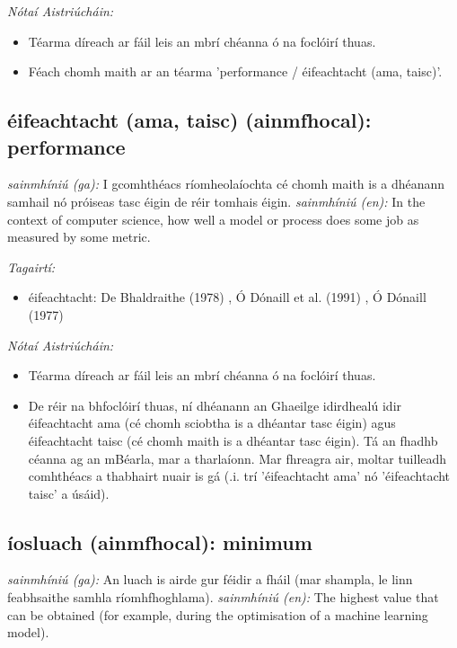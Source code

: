 \documentclass{article}
\begin{document}
 \noindent \textit{Nótaí Aistriúcháin:}
\begin{itemize}
	\item Téarma díreach ar fáil leis an mbrí chéanna ó na foclóirí thuas.
	\item Féach chomh maith ar an téarma 'performance / éifeachtacht (ama, taisc)'.
\end{itemize}


\subsection*{éifeachtacht (ama, taisc) (ainmfhocal): performance} 
 \noindent \textit{sainmhíniú (ga):} I gcomhthéacs ríomheolaíochta cé chomh maith is a dhéanann samhail nó próiseas tasc éigin de réir tomhais éigin.
\newline\newline
 \noindent \textit{sainmhíniú (en):} In the context of computer science, how well a model or process does some job as measured by some metric.
\newline

 \noindent \textit{Tagairtí:}
\begin{itemize}
	\item éifeachtacht: De Bhaldraithe (1978) \cite{de-bhaldraithe}, Ó Dónaill et al. (1991) \cite{focloir-beag}, Ó Dónaill (1977) \cite{odonaill}
\end{itemize}

 \noindent \textit{Nótaí Aistriúcháin:}
\begin{itemize}
	\item Téarma díreach ar fáil leis an mbrí chéanna ó na foclóirí thuas.
	\item De réir na bhfoclóirí thuas, ní dhéanann an Ghaeilge idirdhealú idir éifeachtacht ama (cé chomh sciobtha is a dhéantar tasc éigin) agus éifeachtacht taisc (cé chomh maith is a dhéantar tasc éigin). Tá an fhadhb céanna ag an mBéarla, mar a tharlaíonn. Mar fhreagra air, moltar tuilleadh comhthéacs a thabhairt nuair is gá (.i. trí 'éifeachtacht ama' nó 'éifeachtacht taisc' a úsáid).
\end{itemize}


\subsection*{íosluach (ainmfhocal): minimum} 
 \noindent \textit{sainmhíniú (ga):} An luach is airde gur féidir a fháil (mar shampla, le linn feabhsaithe samhla ríomhfhoghlama).
\newline\newline
 \noindent \textit{sainmhíniú (en):} The highest value that can be obtained (for example, during the optimisation of a machine learning model).
\newline
\end{document}

